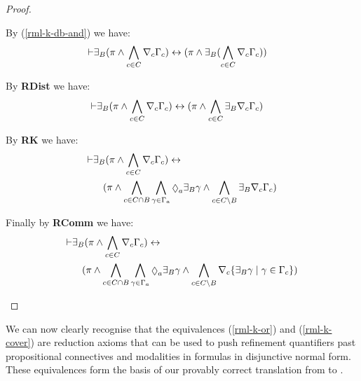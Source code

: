 \begin{proof}
\begin{description}
    By (\ref{rml-k-db-and}) we have:
    \begin{align*}
    \vdash & \displaystyle {\exists_{B}} (\pi \land \bigwedge_{c \in C} \nabla_{c} \Gamma_c) \leftrightarrow 
            (
            \pi \land
            {\exists_{B}} (\bigwedge_{c \in C} \nabla_{c} \Gamma_c)
            )
        \end{align*}

    By {\bf RDist} we have:
    \begin{align*}
    \vdash & \displaystyle {\exists_{B}} (\pi \land \bigwedge_{c \in C} \nabla_{c} \Gamma_c) \leftrightarrow 
            (
            \pi \land
            \bigwedge_{c \in C} {\exists_{B}} \nabla_{c} \Gamma_c
            )
    \end{align*}

    By {\bf RK} we have:
    \begin{align*}
        \proves & \displaystyle \somerefsBs (\pi \land \bigwedge_{\agentC \in \agentsC} \coverC \Gamma_\agentC) \iff \\&\quad
            (
            \pi \land
            \bigwedge_{\agentC \in \agentsC \cap \agentsB} \bigwedge_{\gamma \in \Gamma_\agentA} \possibleA \somerefsBs \gamma \land
            \bigwedge_{\agentC \in \agentsC \setminus \agentsB} \somerefsBs \coverC \Gamma_\agentC
            )
    \end{align*}

    Finally by {\bf RComm} we have:
    \begin{align*}
        \proves & \displaystyle \somerefsBs (\pi \land \bigwedge_{\agentC \in \agentsC} \coverC \Gamma_\agentC) \iff \\&\quad
            (
            \pi \land
            \bigwedge_{\agentC \in \agentsC \cap \agentsB} \bigwedge_{\gamma \in \Gamma_\agentA} \possibleA \somerefsBs \gamma \land
            \bigwedge_{\agentC \in \agentsC \setminus \agentsB} \coversC \{\somerefsBs \gamma \mid \gamma \in \Gamma_\agentC\} 
            )
    \end{align*}
    \end{description}
\end{proof}

We can now clearly recognise that the equivalences (\ref{rml-k-or}) and (\ref{rml-k-cover}) are reduction axioms that can be used to push refinement quantifiers past propositional connectives and modalities in formulas in disjunctive normal form.
These equivalences form the basis of our provably correct translation from \langRml{} to \langMl{}.

